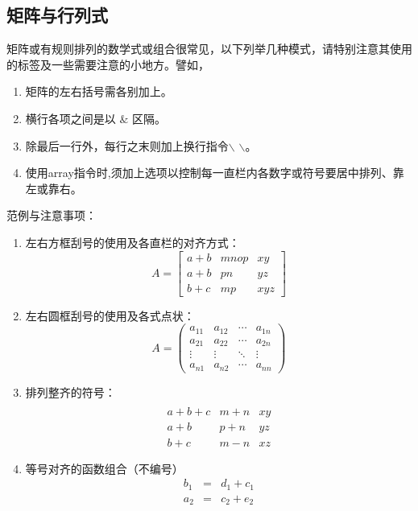 \subsection{矩阵与行列式}
矩阵或有规则排列的数学式或组合很常见，以下列举几种模式，请特别注意其使用的标签及一些需要注意的小地方。譬如，
\begin{enumerate}%
\item 矩阵的左右括号需各别加上。
\item 横行各项之间是以 $\&$ 区隔。
\item 除最后一行外，每行之末则加上换行指令$\backslash$ $\backslash$。
\item 使用array指令时,须加上选项以控制每一直栏内各数字或符号要居中排列、靠左或靠右。
\end{enumerate}
范例与注意事项：
\begin{enumerate}
  \item 左右方框刮号的使用及各直栏的对齐方式：
        $$ A = \left[
            \begin{array}{clr}
                a+b & mnop  & xy \\
                a+b & pn    & yz \\
                b+c & mp    & xyz
            \end{array} \right] $$

  \item 左右圆框刮号的使用及各式点状：
        $$ A=\left(
            \begin{array}{cccc}
                a_{11} & a_{12} & \cdots & a_{1n}\\
                a_{21} & a_{22} & \cdots & a_{2n}\\
                \vdots & \vdots & \ddots & \vdots\\
                a_{n1} & a_{n2} & \cdots & a_{nn}
            \end{array} \right) $$

  \item 排列整齐的符号：
        $$ \begin{array}{clr}\\
            a+b+c   & m+n & xy \\
            a+b     & p+n & yz \\
            b+c     & m-n & xz
        \end{array} $$

    \item 等号对齐的函数组合（不编号）
        \begin{eqnarray*}
          b_1 &=& d_1+c_1 \\
          a_2 &=& c_2+e_2
        \end{eqnarray*}


\end{enumerate}
